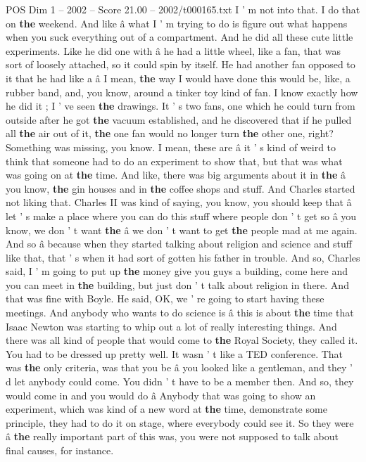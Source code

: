 \begin{textsample}{POS Dim 1 – 2002 – Score 21.00 – 2002/t000165.txt}
I ' m not into that.
I do that on \textbf{the} weekend.
And like â what I ' m trying to do is figure out what happens when you suck everything out of a compartment.
And he did all these cute little experiments.
Like he did one with â he had a little wheel, like a fan, that was sort of loosely attached, so it could spin by itself.
He had another fan opposed to it that he had like a â I mean, \textbf{the} way I would have done this would be, like, a rubber band, and, you know, around a tinker toy kind of fan.
I know exactly how he did it ; I ' ve seen \textbf{the} drawings.
It ' s two fans, one which he could turn from outside after he got \textbf{the} vacuum established, and he discovered that if he pulled all \textbf{the} air out of it, \textbf{the} one fan would no longer turn \textbf{the} other one, right?
Something was missing, you know.
I mean, these are â it ' s kind of weird to think that someone had to do an experiment to show that, but that was what was going on at \textbf{the} time.
And like, there was big arguments about it in \textbf{the} â you know, \textbf{the} gin houses and in \textbf{the} coffee shops and stuff.
And Charles started not liking that.
Charles II was kind of saying, you know, you should keep that â let ' s make a place where you can do this stuff where people don ' t get so â you know, we don ' t want \textbf{the} â we don ' t want to get \textbf{the} people mad at me again.
And so â because when they started talking about religion and science and stuff like that, that ' s when it had sort of gotten his father in trouble.
And so, Charles said, I ' m going to put up \textbf{the} money give you guys a building, come here and you can meet in \textbf{the} building, but just don ' t talk about religion in there.
And that was fine with Boyle.
He said, OK, we ' re going to start having these meetings.
And anybody who wants to do science is â this is about \textbf{the} time that Isaac Newton was starting to whip out a lot of really interesting things.
And there was all kind of people that would come to \textbf{the} Royal Society, they called it.
You had to be dressed up pretty well.
It wasn ' t like a TED conference.
That was \textbf{the} only criteria, was that you be â you looked like a gentleman, and they ' d let anybody could come.
You didn ' t have to be a member then.
And so, they would come in and you would do â Anybody that was going to show an experiment, which was kind of a new word at \textbf{the} time, demonstrate some principle, they had to do it on stage, where everybody could see it.
So they were â \textbf{the} really important part of this was, you were not supposed to talk about final causes, for instance.

\end{textsample}
